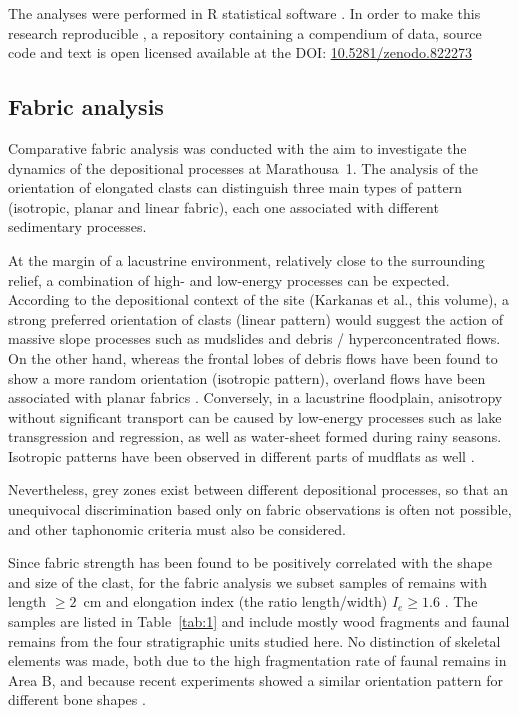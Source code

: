 \documentclass[review,authoryear,times]{elsarticle} %
\begin{document}
The analyses were performed in \textsf{R} statistical software \citep{RCoreTeam2016}. In order to make this research reproducible \citep{Marwick2017}, a repository containing a compendium of data, source code and text is open licensed available at the DOI: \href{https://doi.org/10.5281/zenodo.822273}{10.5281/zenodo.822273}



\subsection{Fabric analysis}

Comparative fabric analysis was conducted with the aim to investigate the dynamics of the depositional processes at Marathousa~1. The analysis of the orientation of elongated clasts can distinguish three main types of pattern (isotropic, planar and linear fabric), each one associated with different sedimentary processes.

At the margin of a lacustrine environment, relatively close to the surrounding relief, a combination of high- and low-energy processes can be expected. According to the depositional context of the site (Karkanas et al., this volume), a strong preferred orientation of clasts (linear pattern) would suggest the action of massive slope processes such as mudslides and debris / hyperconcentrated flows. On the other hand, whereas the frontal lobes of debris flows have been found to show a more random orientation (isotropic pattern), overland flows have been associated with planar fabrics \citep{Lenoble2004}. Conversely, in a lacustrine floodplain, anisotropy without significant transport can be caused by low-energy processes such as lake transgression and regression, as well as water-sheet formed during rainy seasons. Isotropic patterns have been observed in different parts of mudflats as well \citep{Cobo-Sanchez2014}.

Nevertheless, grey zones exist between different depositional processes, so that an unequivocal discrimination based only on fabric observations is often not possible, and other taphonomic criteria must also be considered.

Since fabric strength has been found to be positively correlated with the shape and size of the clast, for the fabric analysis we subset samples of remains with length $\geq2$~cm and elongation index (the ratio length/width) $I_{e}\geq1.6$ \citep{Lenoble2004}. The samples are listed in Table~\ref{tab:1} and include mostly wood fragments %
and faunal remains from the four stratigraphic units studied here. No distinction of skeletal elements was made, both due to the high fragmentation rate of faunal remains in Area B, and because recent experiments showed a similar orientation pattern for different bone shapes \citep{Dominguez-Rodrigo2013,Dominguez-Rodrigo2012}.
\end{document}
